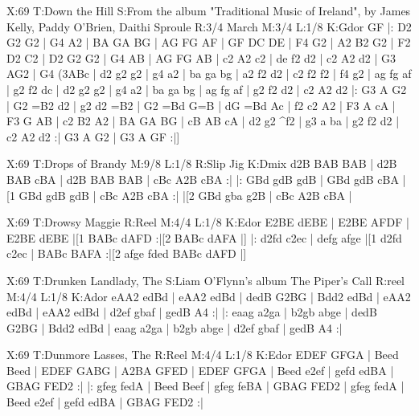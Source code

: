 \documentclass{article}
\begin{document}
\begin{abc}[name]
X:69
T:Down the Hill
S:From the album "Traditional Music of Ireland", by James Kelly, Paddy O'Brien, Daithi Sproule
R:3/4 March
M:3/4
L:1/8
K:Gdor
GF |: D2 G2 G2 | G4 A2 | BA GA BG | AG FG AF |
GF DC DE | F4 G2 | A2 B2 G2 | F2 D2 C2 |
D2 G2 G2 | G4 AB | AG FG AB | c2 A2 c2 |
de f2 d2 | c2 A2 d2 | G3 AG2 | G4 (3ABc |
d2 g2 g2 | g4 a2 | ba ga bg | a2 f2 d2 |
c2 f2 f2 | f4 g2 | ag fg af | g2 f2 dc |
d2 g2 g2 | g4 a2 | ba ga bg | ag fg af |
g2 f2 d2 | c2 A2 d2 |: G3 A G2 | G2 =B2 d2 |
g2 d2 =B2 | G2 =Bd G=B | dG =Bd Ac | f2 c2 A2 |
F3 A cA | F3 G AB | c2 B2 A2 | BA GA BG |
cB AB cA | d2 g2 ^f2 | g3 a ba | g2 f2 d2 |
c2 A2 d2 :| G3 A G2 | G3 A GF :|]
\end{abc}

\begin{abc}[name]
X:69
T:Drops of Brandy
M:9/8
L:1/8
R:Slip Jig
K:Dmix
d2B BAB BAB | d2B BAB cBA | d2B BAB BAB | cBc A2B cBA :|
|: GBd gdB gdB | GBd gdB cBA |[1 GBd gdB gdB | cBc A2B cBA :|
|[2 GBd gba g2B | cBc A2B cBA |
\end{abc}

\begin{abc}[name]
X:69
T:Drowsy Maggie
R:Reel
M:4/4
L:1/8
K:Edor
E2BE dEBE | E2BE AFDF | E2BE dEBE |[1 BABc dAFD :|[2 BABc dAFA |]
|: d2fd c2ec | defg afge |[1 d2fd c2ec | BABc BAFA :|[2 afge fded BABc dAFD |]
\end{abc}

\begin{abc}[name]
X:69
T:Drunken Landlady, The
S:Liam O'Flynn's album The Piper's Call
R:reel
M:4/4
L:1/8
K:Ador
eAA2 edBd | eAA2 edBd | dedB G2BG | Bdd2 edBd |
eAA2 edBd | eAA2 edBd | d2ef gbaf | gedB A4 :|
|: eaag a2ga | b2gb abge | dedB G2BG | Bdd2 edBd |
eaag a2ga | b2gb abge | d2ef gbaf | gedB A4 :|
\end{abc}

\begin{abc}[name]
X:69
T:Dunmore Lasses, The
R:Reel
M:4/4
L:1/8
K:Edor
EDEF GFGA | Beed Beed | EDEF GABG | A2BA GFED |
EDEF GFGA | Beed e2ef | gefd edBA | GBAG FED2 :|
|: gfeg fedA | Beed Beef | gfeg feBA | GBAG FED2 |
gfeg fedA | Beed e2ef | gefd edBA | GBAG FED2 :|
\end{abc}
\end{document}
